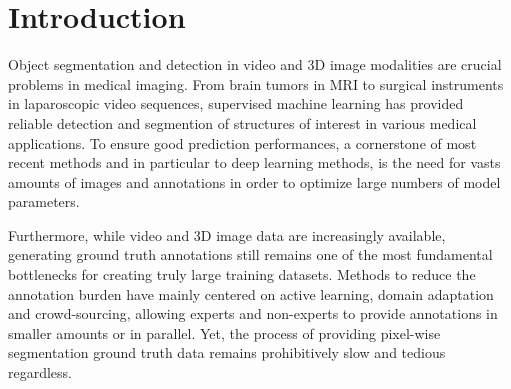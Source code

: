 \chapter{Introduction} %

\label{intro} %

Object segmentation and detection in video and 3D image modalities are crucial problems in medical imaging. From brain tumors in MRI to surgical instruments in laparoscopic video sequences, supervised machine learning has provided reliable detection and segmention of structures of interest in various medical applications. To ensure good prediction performances, a cornerstone of most recent methods and in particular to deep learning methods, is the need for vasts amounts of images and annotations in order to optimize large numbers of model parameters.

Furthermore, while video and 3D image data are increasingly available, generating
ground truth annotations still remains one of the most fundamental bottlenecks
for creating truly large training datasets. Methods to reduce the annotation
burden have mainly centered on active learning,
domain adaptation and
crowd-sourcing, allowing experts and
non-experts to provide annotations in smaller amounts or in parallel. Yet, the
process of providing pixel-wise segmentation ground truth data remains prohibitively slow and tedious regardless.

